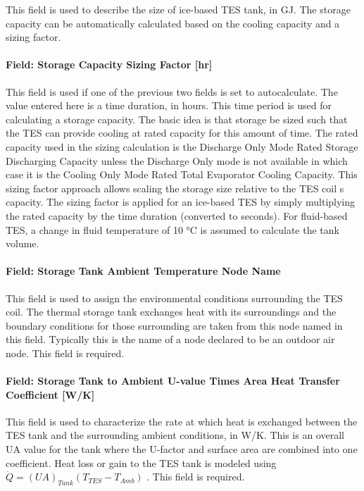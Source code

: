This field is used to describe the size of ice-based TES tank, in GJ. The storage capacity can be automatically calculated based on the cooling capacity and a sizing factor.

\paragraph{Field: Storage Capacity Sizing Factor {[}hr{]}}\label{field-storage-capacity-sizing-factor-hr}

This field is used if one of the previous two fields is set to autocalculate. The value entered here is a time duration, in hours. This time period is used for calculating a storage capacity. The basic idea is that storage be sized such that the TES can provide cooling at rated capacity for this amount of time. The rated capacity used in the sizing calculation is the Discharge Only Mode Rated Storage Discharging Capacity unless the Discharge Only mode is not available in which case it is the Cooling Only Mode Rated Total Evaporator Cooling Capacity. This sizing factor approach allows scaling the storage size relative to the TES coil s capacity. The sizing factor is applied for an ice-based TES by simply multiplying the rated capacity by the time duration (converted to seconds). For fluid-based TES, a change in fluid temperature of 10 °C is assumed to calculate the tank volume.

\paragraph{Field: Storage Tank Ambient Temperature Node Name}\label{field-storage-tank-ambient-temperature-node-name}

This field is used to assign the environmental conditions surrounding the TES coil. The thermal storage tank exchanges heat with its surroundings and the boundary conditions for those surrounding are taken from this node named in this field. Typically this is the name of a node declared to be an outdoor air node. This field is required.

\paragraph{Field: Storage Tank to Ambient U-value Times Area Heat Transfer Coefficient {[}W/K{]}}\label{field-storage-tank-to-ambient-u-value-times-area-heat-transfer-coefficient-wk}

This field is used to characterize the rate at which heat is exchanged between the TES tank and the surrounding ambient conditions, in W/K. This is an overall UA value for the tank where the U-factor and surface area are combined into one coefficient. Heat loss or gain to the TES tank is modeled using \(\dot Q = {\left( {UA} \right)_{Tank}}\left( {{T_{TES}} - {T_{Amb}}} \right)\) . This field is required.

